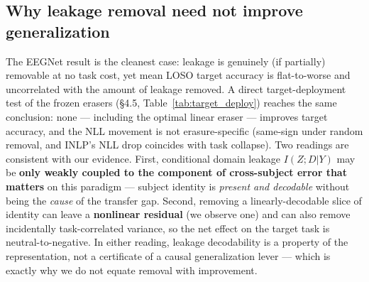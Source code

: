 \subsection{Why leakage removal need not improve generalization}
The EEGNet result is the cleanest case: leakage is genuinely (if partially) removable at no task cost, yet
mean LOSO target accuracy is flat-to-worse and uncorrelated with the amount of leakage removed. A direct target-deployment test of the frozen erasers (\S4.5, Table~\ref{tab:target_deploy}) reaches the same conclusion: none --- including the optimal linear eraser --- improves target accuracy, and the NLL movement is not erasure-specific (same-sign under random removal, and INLP's NLL drop coincides with task collapse). Two
readings are consistent with our evidence. First, conditional domain leakage $I(Z;D|Y)$ may be \textbf{only weakly
coupled to the component of cross-subject error that matters} on this paradigm --- subject identity is
\emph{present and decodable} without being the \emph{cause} of the transfer gap. Second, removing a linearly-decodable
slice of identity can leave a \textbf{nonlinear residual} (we observe one) and can also remove incidentally
task-correlated variance, so the net effect on the target task is neutral-to-negative. In either reading,
leakage decodability is a property of the representation, not a certificate of a causal generalization
lever --- which is exactly why we do not equate removal with improvement.


